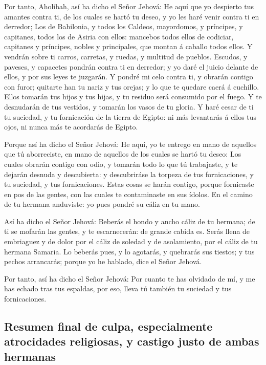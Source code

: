  Por tanto, Aholibah, así ha dicho el Señor Jehová: He aquí
que yo despierto tus amantes contra ti, de los cuales se hartó tu deseo,
y yo les haré venir contra ti en derredor;  Los de
Babilonia, y todos los Caldeos, mayordomos, y príncipes, y capitanes,
todos los de Asiria con ellos: mancebos todos ellos de codiciar,
capitanes y príncipes, nobles y principales, que montan á caballo todos
ellos.  Y vendrán sobre ti carros, carretas, y ruedas, y
multitud de pueblos. Escudos, y paveses, y capacetes pondrán contra ti
en derredor; y yo daré el juicio delante de ellos, y por sus leyes te
juzgarán.  Y pondré mi celo contra ti, y obrarán contigo
con furor; quitarte han tu nariz y tus orejas; y lo que te quedare caerá
á cuchillo. Ellos tomarán tus hijos y tus hijas, y tu residuo será
consumido por el fuego.  Y te desnudarán de tus vestidos, y
tomarán los vasos de tu gloria.  Y haré cesar de ti tu
suciedad, y tu fornicación de la tierra de Egipto: ni más levantarás á
ellos tus ojos, ni nunca más te acordarás de Egipto.

 Porque así ha dicho el Señor Jehová: He aquí, yo te
entrego en mano de aquellos que tú aborreciste, en mano de aquellos de
los cuales se hartó tu deseo:  Los cuales obrarán contigo
con odio, y tomarán todo lo que tú trabajaste, y te dejarán desnuda y
descubierta: y descubriráse la torpeza de tus fornicaciones, y tu
suciedad, y tus fornicaciones.  Estas cosas se harán
contigo, porque fornicaste en pos de las gentes, con las cuales te
contaminaste en sus ídolos.  En el camino de tu hermana
anduviste: yo pues pondré su cáliz en tu mano.

 Así ha dicho el Señor Jehová: Beberás el hondo y ancho
cáliz de tu hermana; de ti se mofarán las gentes, y te escarnecerán: de
grande cabida es.  Serás llena de embriaguez y de dolor por
el cáliz de soledad y de asolamiento, por el cáliz de tu hermana
Samaria.  Lo beberás pues, y lo agotarás, y quebrarás sus
tiestos; y tus pechos arrancarás; porque yo he hablado, dice el Señor
Jehová.

 Por tanto, así ha dicho el Señor Jehová: Por cuanto te has
olvidado de mí, y me has echado tras tus espaldas, por eso, lleva tú
también tu suciedad y tus fornicaciones.

\hypertarget{resumen-final-de-culpa-especialmente-atrocidades-religiosas-y-castigo-justo-de-ambas-hermanas}{%
\subsection{Resumen final de culpa, especialmente atrocidades
religiosas, y castigo justo de ambas
hermanas}\label{resumen-final-de-culpa-especialmente-atrocidades-religiosas-y-castigo-justo-de-ambas-hermanas}}

